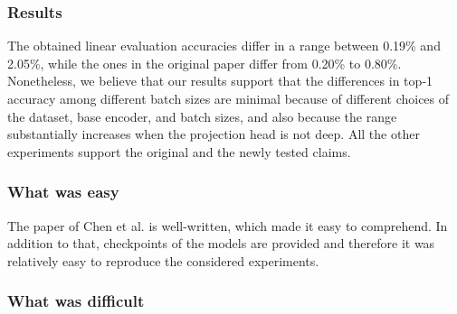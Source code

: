 \subsubsection*{Results}

The obtained linear evaluation accuracies differ in a range between 0.19\% and 2.05\%, while the ones in the original paper differ from 0.20\% to 0.80\%. Nonetheless, we believe that our results support that the differences in top‐1 accuracy among different batch sizes are minimal because of different choices of the dataset, base encoder, and batch sizes, and also because the range substantially increases when the projection head is not deep. All the other experiments support the original and the newly tested claims. 


\subsubsection*{What was easy}

The paper of Chen et al. \cite{chen2021intriguing} is well-written, which made it easy to comprehend. In addition to that, checkpoints of the models are provided and therefore it was relatively easy to reproduce the considered experiments.

\subsubsection*{What was difficult}


